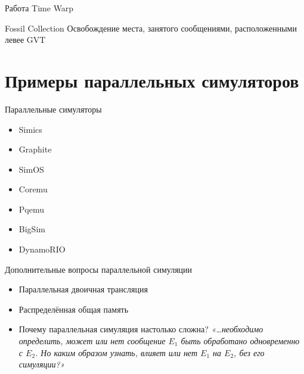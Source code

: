 \documentclass{beamer}
\begin{document}
\begin{frame}{Работа Time Warp}
\centering
 
\end{frame}

\begin{frame}{Fossil Collection}
Освобождение места, занятого сообщениями, расположенными левее GVT
\end{frame}

\section{Примеры параллельных симуляторов}

\begin{frame}{Параллельные симуляторы}
\begin{itemize}
    \item Simics
    \item Graphite
    \item SimOS
    \item Coremu
    \item Pqemu
    \item BigSim
    \item DynamoRIO
\end{itemize}
\end{frame}

\begin{frame}{Дополнительные вопросы параллельной симуляции}
\begin{itemize}
	\item Параллельная двоичная трансляция
	\item Распределённая общая память \pause
	\item Почему параллельная симуляция настолько сложна? \pause \textit{«\dots необходимо определить, может или нет сообщение $E_1$ быть обработано одновременно с $E_2$. Но каким образом узнать, влияет или нет $E_1$ на $E_2$, без его симуляции?»}
\end{itemize}    
\end{frame}



% 
\end{document}
